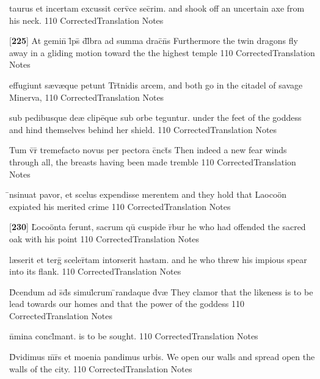 \latline
  {taurus et incertam excussit cerv\={\macron {\i}}ce sec\={}rim.}
  { and shook off an uncertain axe from his neck.  }
  {110}
  { CorrectedTranslation }
  { Notes }


\latline
  {[\textbf{225}] At gemin\={\macron {\i}} l\={}ps\={} d\={}l\={}bra ad summa drac\={}n\={}s}
  { Furthermore the twin dragons fly away in a gliding motion toward the the highest temple }
  {110}
  { CorrectedTranslation }
  { Notes }


\latline
  {effugiunt s{\ae}v{\ae}que petunt Tr\={\macron {\i}}t\={}nidis arcem,}
  { and both go in the citadel of savage Minerva, }
  {110}
  { CorrectedTranslation }
  { Notes }


\latline
  {sub pedibusque de{\ae} clipe\={\macron {\i}}que sub orbe teguntur.}
  { under the feet of the goddess and hind themselves behind her shield. }
  {110}
  { CorrectedTranslation }
  { Notes }


\latline
  {Tum v\={}r\={} tremefacto novus per pectora c\={}nct\={\macron {\i}}s}
  { Then indeed a new fear winds through all, the breasts having been made tremble }
  {110}
  { CorrectedTranslation }
  { Notes }


\latline
  {\={\macron {\i}}nsinuat pavor, et scelus expendisse merentem}
  { and they hold that Laoco\"on expiated his merited crime  }
  {110}
  { CorrectedTranslation }
  { Notes }


\latline
  {[\textbf{230}] L\={}oco\"{o}nta ferunt, sacrum qu\={\macron {\i}} cuspide r\={}bur }
  { he who had offended the sacred oak with his point }
  {110}
  { CorrectedTranslation }
  { Notes }


\latline
  {l{\ae}serit et terg\={} sceler\={}tam intorserit hastam.}
  { and he who threw his impious spear into its flank. }
  {110}
  { CorrectedTranslation }
  { Notes }


\latline
  {D\={}cendum ad s\={}d\={}s simul\={}crum \={}randaque d\={\macron {\i}}v{\ae}}
  { They clamor that the likeness is to be lead towards our homes and that the power of the goddess  }
  {110}
  { CorrectedTranslation }
  { Notes }


\latline
  {n\={}mina concl\={}mant.}
  { is to be sought. }
  {110}
  { CorrectedTranslation }
  { Notes }


\latline
  {D\={\macron {\i}}vidimus m\={}r\={}s et moenia pandimus urbis.}
  { We open our walls and spread open the walls of the city. }
  {110}
  { CorrectedTranslation }
  { Notes }



